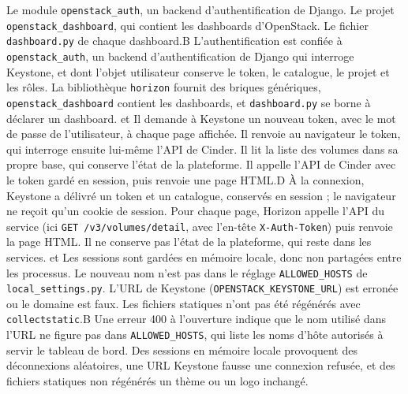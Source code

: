   {Le module \texttt{openstack\_auth}, un backend d'authentification de Django.}
  {Le projet \texttt{openstack\_dashboard}, qui contient les dashboards d'OpenStack.}
  {Le fichier \texttt{dashboard.py} de chaque dashboard.}{B}
  {L'authentification est confiée à \texttt{openstack\_auth}, un backend d'authentification de Django qui interroge Keystone, et dont l'objet utilisateur conserve le token, le catalogue, le projet et les rôles. La bibliothèque \texttt{horizon} fournit des briques génériques, \texttt{openstack\_dashboard} contient les dashboards, et \texttt{dashboard.py} se borne à déclarer un dashboard.}
  { et }
  {Il demande à Keystone un nouveau token, avec le mot de passe de l'utilisateur, à chaque page affichée.}
  {Il renvoie au navigateur le token, qui interroge ensuite lui-même l'API de Cinder.}
  {Il lit la liste des volumes dans sa propre base, qui conserve l'état de la plateforme.}
  {Il appelle l'API de Cinder avec le token gardé en session, puis renvoie une page HTML.}{D}
  {À la connexion, Keystone a délivré un token et un catalogue, conservés en session ; le navigateur ne reçoit qu'un cookie de session. Pour chaque page, Horizon appelle l'API du service (ici \texttt{GET /v3/volumes/detail}, avec l'en-tête \texttt{X-Auth-Token}) puis renvoie la page HTML. Il ne conserve pas l'état de la plateforme, qui reste dans les services.}
  { et }
  {Les sessions sont gardées en mémoire locale, donc non partagées entre les processus.}
  {Le nouveau nom n'est pas dans le réglage \texttt{ALLOWED\_HOSTS} de \texttt{local\_settings.py}.}
  {L'URL de Keystone (\texttt{OPENSTACK\_KEYSTONE\_URL}) est erronée ou le domaine est faux.}
  {Les fichiers statiques n'ont pas été régénérés avec \texttt{collectstatic}.}{B}
  {Une erreur 400 à l'ouverture indique que le nom utilisé dans l'URL ne figure pas dans \texttt{ALLOWED\_HOSTS}, qui liste les noms d'hôte autorisés à servir le tableau de bord. Des sessions en mémoire locale provoquent des déconnexions aléatoires, une URL Keystone fausse une connexion refusée, et des fichiers statiques non régénérés un thème ou un logo inchangé.}
